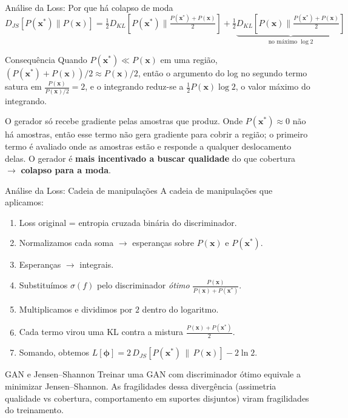 \documentclass[aspectratio=169,xcolor=dvipsnames]{beamer}
\begin{document}
  \begin{frame}{Análise da Loss: Por que há colapso de moda}
    \[
      D_{JS}[P(\mathbf{x}^*)\|P(\mathbf{x})] =
      \tfrac{1}{2}D_{KL}\!\!\left[P(\mathbf{x}^*)\Big\|\tfrac{P(\mathbf{x}^*)+P(\mathbf{x})}{2}\right]
      + \tfrac{1}{2}\underbrace{D_{KL}\!\!\left[P(\mathbf{x})\Big\|\tfrac{P(\mathbf{x}^*)+P(\mathbf{x})}{2}\right]}_{\text{no máximo } \log 2}
    \]
    \vspace{0.4em}
    \begin{alertblock}{Consequência}
      Quando $P(\mathbf{x}^*) \ll P(\mathbf{x})$ em uma região,
      $(P(\mathbf{x}^*){+}P(\mathbf{x}))/2 \approx P(\mathbf{x})/2$, então o argumento do log no
      \textcolor{DiscBlue}{segundo termo} satura em
      $\tfrac{P(\mathbf{x})}{P(\mathbf{x})/2} = 2$, e o integrando reduz-se a
      $\tfrac{1}{2}P(\mathbf{x})\log 2$, o valor máximo do integrando.
      \vspace{0.3em}

      O gerador só recebe gradiente pelas amostras que produz. Onde
      $P(\mathbf{x}^*) \approx 0$ não há amostras, então esse termo não gera
      gradiente para cobrir a região; o primeiro termo é avaliado onde
      as amostras estão e responde a qualquer deslocamento delas.
      O gerador é \textbf{mais incentivado a buscar qualidade}
      do que cobertura $\to$ \textbf{colapso para a moda}.
    \end{alertblock}
  \end{frame}

  \begin{frame}{Análise da Loss: Cadeia de manipulações}
    A cadeia de manipulações que aplicamos:
    \begin{enumerate}
      \item Loss original = entropia cruzada binária do discriminador.
      \item Normalizamos cada soma $\to$ esperanças sobre $P(\mathbf{x})$ e $P(\mathbf{x}^{*})$.
      \item Esperanças $\to$ integrais.
      \item Substituímos $\sigma(f)$ pelo discriminador
      \emph{ótimo} $\frac{P(\mathbf{x})}{P(\mathbf{x})+P(\mathbf{x}^{*})}$.
      \item Multiplicamos e dividimos por $2$ dentro do logaritmo.
      \item Cada termo virou uma KL contra a mistura
      $\frac{P(\mathbf{x})+P(\mathbf{x}^{*})}{2}$.
      \item Somando, obtemos $L[\bm{\phi}] = 2\,D_{JS}\!\left[P(\mathbf{x}^{*})\,\|\,P(\mathbf{x})\right] - 2\ln 2$.
    \end{enumerate}
    \begin{alertblock}{GAN e Jensen--Shannon}
      Treinar uma GAN com discriminador ótimo equivale a minimizar
      Jensen--Shannon. As fragilidades dessa divergência (assimetria
      qualidade vs cobertura, comportamento em suportes disjuntos)
      viram fragilidades do treinamento.
    \end{alertblock}
  \end{frame}
\end{document}
